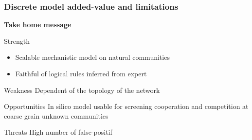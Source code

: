 \documentclass[8pt,usenames,dvipsnames]{beamer}
\begin{document}
\begin{frame}
\frametitle{Discrete model added-value and limitations}
\centering
\textbf{\huge Take home message}


\begin{minipage}{0.45\textwidth}
\vspace{0.3cm}
\begin{block}{Strength}
\begin{itemize}
\item Scalable mechanistic model on natural communities
\item Faithful of logical rules inferred from expert
\end{itemize}
\end{block} %
\end{minipage}\hfill
\hspace{0.5cm}
\hfill
\begin{minipage}{0.45\textwidth}
\begin{block}{Weakness}
Dependent of the topology of the network
\end{block}
\end{minipage}


\begin{minipage}{0.45\textwidth}
\begin{block}{Opportunities}
In silico model usable for screening cooperation and competition at coarse grain unknown communities
\end{block} %
\end{minipage}\hfill
\hspace{0.5cm}
\hfill
\begin{minipage}{0.45\textwidth}
\begin{block}{Threats}
High number of false-positif
\end{block}
\end{minipage}


\end{frame}
\end{document}
